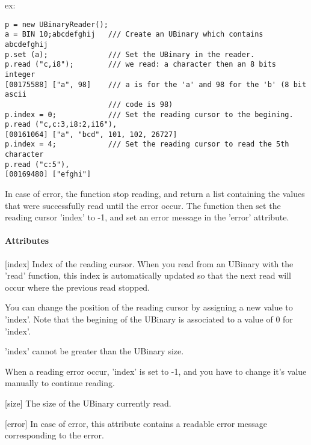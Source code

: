 \begin{description}
ex:


\begin{lstlisting}[firstnumber=1,]
p = new UBinaryReader();
a = BIN 10;abcdefghij   /// Create an UBinary which contains abcdefghij
p.set (a);              /// Set the UBinary in the reader.
p.read ("c,i8");        /// we read: a character then an 8 bits integer
[00175588] ["a", 98]    /// a is for the 'a' and 98 for the 'b' (8 bit ascii
                        /// code is 98)
p.index = 0;            /// Set the reading cursor to the begining.
p.read ("c,c:3,i8:2,i16"),
[00161064] ["a", "bcd", 101, 102, 26727]
p.index = 4;            /// Set the reading cursor to read the 5th character
p.read ("c:5"),
[00169480] ["efghi"]
\end{lstlisting}

          In case of error, the function stop reading, and return a
          list containing the values that were successfully read until
          the error occur. The function then set the reading cursor
          'index' to -{}1, and set an error message in the 'error'
          attribute.

\end{description}

\paragraph{Attributes}
\label{webots.uobjects.other.ubinaryreader.attributes}%

\noindent
\begin{description}
\item{}[{index}] Index of the reading cursor. When you read from an
  UBinary with the 'read' function, this index is automatically
  updated so that the next read will occur where the previous read
  stopped.


  You can change the position of the reading cursor by assigning a new
  value to 'index'. Note that the begining of the UBinary is
  associated to a value of 0 for 'index'.


  'index' cannot be greater than the UBinary size.


  When a reading error occur, 'index' is set to -{}1, and you have to
  change it's value manually to continue reading.

\item{}[{size}]           The size of the UBinary currently read.

\item{}[{error}]          In case of error, this attribute contains a readable error message
          corresponding to the error.

\end{description}


